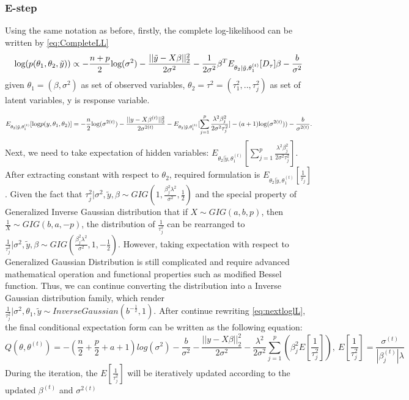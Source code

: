 \subsubsection{E-step}
Using the same notation as before, firstly, the complete log-likelihood can be written by \autoref{eq:CompleteLL}
\begin{equation}
	\label{eq:CompleteLL}
	\textnormal{log}(p(\theta_1,\theta_2,\tilde{y})) \propto -\frac{n+p}{2}\textnormal{log}(\sigma^2) - \frac{||\tilde{y}-X\beta||_2^2}{2\sigma^2} - \frac{1}{2\sigma^2}\beta^TE_{\theta_2|\tilde{y},\theta_1^{(t)}}[D_{\tau}]\beta - \frac{b}{\sigma^2}
\end{equation}
given $\theta_1 = (\beta,\sigma^2)$ as set of observed variables, $\theta_2 = \tau^2 = (\tau_1^2,..,\tau_j^2)$ as set of latent variables, y is response variable.


\begin{equation}
	\label{eq:nextloglL}
	E_{\theta_2|\tilde{y},\theta_1^{(t)}}[\textnormal{log}p(y,\theta_1,\theta_2)] = -\frac{n}{2} \textnormal{log}(\sigma^{2(t)}) - \frac{||y-X\beta^{(t)}||_2^2}{2\sigma^{2(t)}} - E_{\theta_2 |\tilde{y},\theta_1^{(t)}}[\sum_{j=1}^p \frac{\lambda^2\beta_j^2}{2\sigma^2\tau_j^2}] -(a+1)\textnormal{log}(\sigma^{2(t)})) - \frac{b}{\sigma^{2(t)}}.
\end{equation}
Next, we need to take expectation of hidden variables: $E_{\theta_2 |\tilde{y},\theta_1^{(t)}}[\sum_{j=1}^p \frac{\lambda^2\beta_j^2}{2\sigma^2\tau_j^2}]$. After extracting constant with respect to $\theta_2$, required formulation is $E_{\theta_2 |\tilde{y},\theta_1^{(t)}}[\frac{1}{\tau_j}]$. Given the fact that $\tau_j^2|\sigma^2,\tilde{y},\beta \sim GIG(1,\frac{\beta_j^2\lambda^2}{\sigma^2},\frac{1}{2})$ and the special property of Generalized Inverse Gaussian distribution that if $X \sim GIG(a,b,p)$, then $\frac{1}{X} \sim GIG(b,a,-p)$, the distribution of $\frac{1}{\tau_j^2}$ can be rearranged to  $\frac{1}{\tau_j^2}|\sigma^2,\tilde{y},\beta \sim GIG(\frac{\beta_j^2\lambda^2}{\sigma^2},1,-\frac{1}{2})$.
However, taking expectation with respect to Generalized Gaussian Distribution is still complicated and require advanced mathematical operation and functional properties such as modified Bessel function. Thus, we can continue converting the distribution into a Inverse Gaussian distribution family, which render $\frac{1}{\tau_j^2}|\sigma^2,\theta_1,\tilde{y} \sim InverseGaussian(b^{-\frac{1}{2}},1)$. After continue rewriting \autoref{eq:nextloglL}, the final conditional expectation form can be written as the following equation:
\begin{equation}
	Q(\theta,\theta^{(t)}) = -(\frac{n}{2}+\frac{p}{2}+a+1)log(\sigma^2)-\frac{b}{\sigma^2}-\frac{||y-X\beta||_2^2}{2\sigma^2}-\frac{\lambda^2}{2\sigma^2}\sum_{j=1}^{p}(\beta_j^2 E[\frac{1}{\tau_j^2}]),\
	E[\frac{1}{\tau_j^2}] = \frac{\sigma^{(t)}}{|\beta_j^{(t)}|\lambda}
\end{equation}
During the iteration, the $E[\frac{1}{\tau_j^2}]$ will be iteratively updated according to the updated $\beta^{(t)}$ and $\sigma^{2(t)}$


